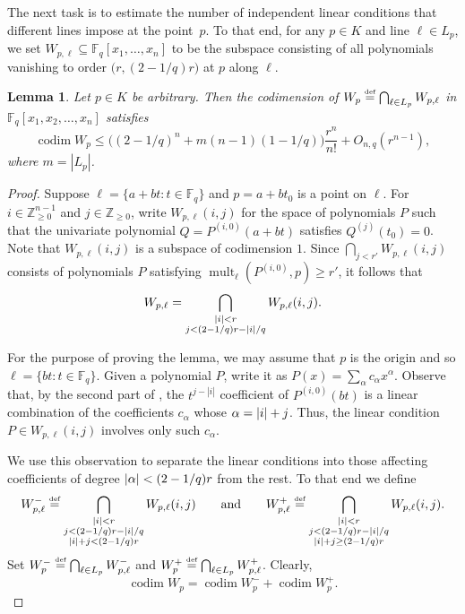 \documentclass{daj}
\newtheorem{lemma}[theorem]{Lemma}
\theoremstyle{definition}
\newcommand*{\eqdef}{\stackrel{\mbox{\normalfont\tiny def}}{=}}   %
\newcommand*{\Znneg}{\mathbb{Z}_{\geq 0}}                          %
\newcommand*{\Fq}{\mathbb{F}_q}                                  %
\DeclarePairedDelimiter\abs{\lvert}{\rvert}                     %
\DeclareMathOperator{\mult}{mult}                              %
\DeclareMathOperator{\codim}{codim}                            %
\begin{document}
The next task is to estimate the number of independent linear conditions that different lines
impose at the point~$p$. To that end, for any $p\in K$ and line $\ell\in L_p$, we set $W_{p,\ell}\subseteq \Fq[x_1,\dotsc,x_n]$ to be the subspace consisting of all polynomials vanishing to order $\bigl(r,(2-1/q)r\bigr)$ at $p$ along $\ell$.

\begin{lemma}\label{lemma:Codim}
  Let $p\in K$ be arbitrary.
Then the codimension of $W_p\eqdef \bigcap_{\ell\in L_p} W_{p,\ell}$ in $\Fq[x_1,x_2,\dotsc,x_n]$ satisfies 
\[
\codim W_p\leq \bigl((2-1/q)^n+m(n-1)(1-1/q)\bigr)\frac{r^n}{n!}+O_{n,q}(r^{n-1}),
\]
where $m=|L_p|$.
\end{lemma}

\begin{proof}
  Suppose $\ell=\{a+bt:t\in\Fq\}$ and $p=a+bt_0$ is a point on $\ell$.
  For $i\in \Znneg^{n-1}$ and $j\in \Znneg$, write $W_{p,\ell}(i,j)$ for the space of polynomials $P$ such that
  the univariate polynomial $Q=P^{(i,0)}(a+bt)$ satisfies $Q^{(j)}(t_0)=0$.
  Note that $W_{p,\ell}(i,j)$ is a subspace of codimension $1$.
  Since $\bigcap_{j<r'} W_{p,\ell}(i,j)$ consists of polynomials $P$ satisfying $\mult_{\ell}(P^{(i,0)},p)\geq r'$,
  it follows that
  \[
    W_{p,\ell}=\bigcap_{\substack{\abs{i}<r\\j<(2-1/q)r-\abs{i}/q}} W_{p,\ell}(i,j).
  \]

  For the purpose of proving the lemma, we may assume that $p$ is the origin and so $\ell=\{bt : t\in\Fq\}$.
  Given a polynomial $P$, write it as $P(x)=\sum_\alpha c_\alpha x^\alpha$. 
  Observe that, by the second part of , the $t^{j-|i|}$ coefficient of $P^{(i,0)}(bt)$ is a linear combination of the coefficients $c_\alpha$ whose $\alpha=\abs{i}+j$. Thus, the linear condition $P\in W_{p,\ell}(i,j)$ involves only such $c_\alpha$.

  We use this observation to separate the linear conditions into those affecting coefficients of degree $\abs{\alpha}<(2-1/q)r$
  from the rest. To that end we define
  \begin{equation}\label{eq:wpsep}
    W_{p,\ell}^{-}\eqdef \bigcap_{\substack{\abs{i}<r\\j<(2-1/q)r-\abs{i}/q\\\abs{i}+j<(2-1/q)r}} W_{p,\ell}(i,j)\qquad\text{and}\qquad
    W_{p,\ell}^{+}\eqdef \bigcap_{\substack{\abs{i}<r\\j<(2-1/q)r-\abs{i}/q\\\abs{i}+j\geq (2-1/q)r}} W_{p,\ell}(i,j).
  \end{equation}
  Set $W_p^{-}\eqdef \bigcap_{\ell\in L_p} W_{p,\ell}^{-}$ and $W_p^{+}\eqdef \bigcap_{\ell\in L_p} W_{p,\ell}^{+}$. Clearly,
  \begin{equation}\label{eq:wpadditive}
    \codim W_p=\codim W_p^{-}+\codim W_p^{+}.
  \end{equation}
    

\end{proof}
\end{document}
